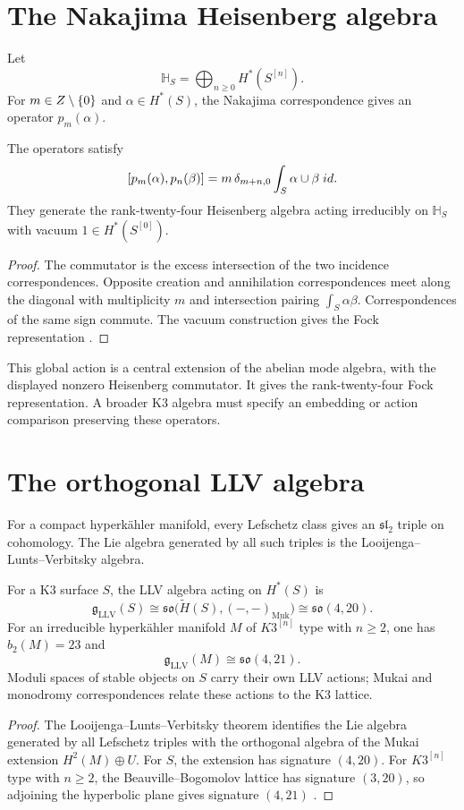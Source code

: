\chapter{The Nakajima Heisenberg algebra}
Let
\[
 \mathbb H_S=\bigoplus_{n\ge0}H^*(S^{[n]}).
\]
For $m\in Z\setminus\{0\}$ and $\alpha\in H^*(S)$, the Nakajima correspondence gives an operator $p_m(\alpha)$.

\begin{theorem}
The operators satisfy
\[
 [p_m(\alpha),p_n(\beta)]
 =m\,\delta_{m+n,0}\int_S\alpha\cup\beta\;id.
\]
They generate the rank-twenty-four Heisenberg algebra acting irreducibly on $\mathbb H_S$ with vacuum $1\in H^*(S^{[0]})$.
\end{theorem}
\begin{proof}
The commutator is the excess intersection of the two incidence correspondences. Opposite creation and annihilation correspondences meet along the diagonal with multiplicity $m$ and intersection pairing $\int_S\alpha\beta$. Correspondences of the same sign commute. The vacuum construction gives the Fock representation \cite{Nakajima97}.
\end{proof}

This global action is a central extension of the abelian mode algebra, with the displayed nonzero Heisenberg commutator.
It gives the rank-twenty-four Fock representation.
A broader K3 algebra must specify an embedding or action comparison preserving these operators.

\chapter{The orthogonal LLV algebra}
For a compact hyperkähler manifold, every Lefschetz class gives an $\mathfrak{sl}_2$ triple on cohomology. The Lie algebra generated by all such triples is the Looijenga--Lunts--Verbitsky algebra.

\begin{theorem}
For a K3 surface $S$, the LLV algebra acting on $H^*(S)$ is
\[
 \mathfrak g_{\mathrm{LLV}}(S)
 \cong\mathfrak{so}\bigl(\widetilde H(S),(-,-)_{\mathrm{Muk}}\bigr)
 \cong\mathfrak{so}(4,20).
\]
For an irreducible hyperk\"ahler manifold $M$ of $K3^{[n]}$ type with $n\ge2$, one has $b_2(M)=23$ and
\[
 \mathfrak g_{\mathrm{LLV}}(M)\cong\mathfrak{so}(4,21).
\]
Moduli spaces of stable objects on $S$ carry their own LLV actions; Mukai and monodromy correspondences relate these actions to the K3 lattice.
\end{theorem}
\begin{proof}
The Looijenga--Lunts--Verbitsky theorem identifies the Lie algebra generated by all Lefschetz triples with the orthogonal algebra of the Mukai extension $H^2(M)\oplus U$. For $S$, the extension has signature $(4,20)$. For $K3^{[n]}$ type with $n\ge2$, the Beauville--Bogomolov lattice has signature $(3,20)$, so adjoining the hyperbolic plane gives signature $(4,21)$ \cite{LooijengaLunts,Verbitsky96}.
\end{proof}

